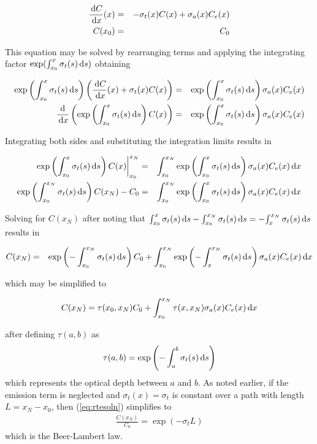 \begin{eqnarray}
\frac{\,\mbox{d}C}{\,\mbox{d}x}(x)&=&-\sigma_t(x) C(x) + \sigma_a(x) C_e(x)\\
 C(x_0)&=&C_0
\end{eqnarray}

This equation may be solved by rearranging terms and applying the integrating factor $\exp(\int_{x_0}^x \sigma_t(s) \,\mbox{d}s)$ obtaining

\begin{eqnarray}
\exp\left({\int_{x_0}^{x} \sigma_t(s) \,\mbox{d}s}\right)\left(\frac{\,\mbox{d}C}{\,\mbox{d}x}(x)+\sigma_t(x) C(x)\right)&=&  \exp\left({\int_{x_0}^{x} \sigma_t(s) \,\mbox{d}s}\right)\sigma_a(x) C_e(x)\\
\frac{\mbox{d}}{\,\mbox{d}x}\left(\exp\left({\int_{x_0}^{x} \sigma_t(s) \,\mbox{d}s}\right) C(x)\right)&=& \exp\left({\int_{x_0}^{x} \sigma_t(s) \,\mbox{d}s}\right)\sigma_a(x) C_e(x)
\end{eqnarray}

Integrating both sides and substituting the integration limits results in

\begin{eqnarray}
\left.\exp\left({\int_{x_0}^{x} \sigma_t(s) \,\mbox{d}s}\right) C(x)\right|_{x_0}^{x_N}&=& \int_{x_0}^{x_N}\exp\left({\int_{x_0}^{x} \sigma_t(s) \,\mbox{d}s}\right)\sigma_a(x) C_e(x) \,\mbox{d}x \\
\exp\left({\int_{x_0}^{x_N} \sigma_t(s) \,\mbox{d}s}\right) C(x_N)-C_0&=& \int_{x_0}^{x_N}\exp\left({\int_{x_0}^{x} \sigma_t(s) \,\mbox{d}s}\right)\sigma_a(x) C_e(x) \,\mbox{d}x
\end{eqnarray}

Solving for $C(x_N)$ after noting that ${\int_{x_0}^{x} \sigma_t(s) \,\mbox{d}s}-{\int_{x_0}^{x_N} \sigma_t(s) \,\mbox{d}s}=-{\int_{x}^{x_N} \sigma_t(s) \,\mbox{d}s}$ results in

\begin{eqnarray}
C(x_N)&=&\exp\left({-\int_{x_0}^{x_N} \sigma_t(s) \,\mbox{d}s}\right) C_0+ \int_{x_0}^{x_N}\exp\left({-\int_{x}^{x_N} \sigma_t(s) \,\mbox{d}s}\right)\sigma_a(x)
C_e(x) \,\mbox{d}x
\end{eqnarray}

\noindent which may be simplified to

\begin{equation}
\label{eq:rtesoln}
 C(x_N)=\tau(x_0,x_N)C_0 + \int_{x_0}^{x_N}\tau(x,x_N)\siga\Le \dx{x}
\end{equation}

\noindent after defining $\tau(a,b)$ as
\begin{equation}
\label{eq:optdepth}
\tau(a,b)=\intmf{a}{b}
\end{equation}
which represents the optical depth between $a$ and $b$.  As noted earlier, if the emission term is neglected and $\sigma_t(x)=\sigma_t$ is constant over a path with length
$L=x_N-x_0$, then (\ref{eq:rtesoln}) simplifies to
\begin{eqnarray}
 \frac{C(x_N)}{C_0}=\exp(-\sigma_tL)
\end{eqnarray}
which is the Beer-Lambert law.


